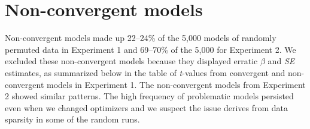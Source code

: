 \documentclass[authoryear, 12pt]{elsarticle}
\begin{document}
\section{Non-convergent models}
\setcounter{table}{0}  

Non-convergent models made up 22--24\% of the 5,000 models of randomly permuted data in Experiment 1 and 69--70\% of the 5,000 for Experiment 2. We excluded these non-convergent models because they displayed erratic $\beta$ and \textit{SE} estimates, as summarized below in the table of \textit{t}-values from convergent and non-convergent models in Experiment 1. The non-convergent models from Experiment 2 showed similar patterns. The high frequency of problematic models persisted even when we changed optimizers and we suspect the issue derives from data sparsity in some of the random runs.
\end{document}
